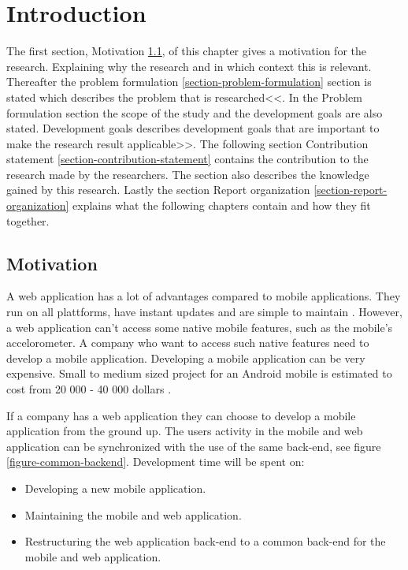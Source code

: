 \chapter{Introduction}\label{chapter-introduction}
The first section, Motivation \ref{section-motivation}, of this chapter gives a motivation for the research. Explaining why the research and in which context this is relevant. Thereafter the problem formulation \ref{section-problem-formulation} section is stated which describes the problem that is researched<<. In the Problem formulation section the scope of the study and the development goals are also stated. Development goals describes development goals that are important to make the research result applicable>>. The following section Contribution statement \ref{section-contribution-statement} contains the contribution to the research made by the researchers. The section also describes the knowledge gained by this research. Lastly the section Report organization \ref{section-report-organization} explains what the following chapters contain and how they fit together.

\section{Motivation}\label{section-motivation}
A web application has a lot of advantages compared to mobile applications. They run on all plattforms, have instant updates and are simple to maintain \cite{michaels2013}. However, a web application can't access some native mobile features, such as the mobile's accelorometer. A company who want to access such native features need to develop a mobile application. Developing a mobile application can be very expensive. Small to medium sized project for an Android mobile is estimated to cost from 20 000 - 40 000 dollars \cite{kohan2015}.

If a company has a web application they can choose to develop a mobile application from the ground up. The users activity in the mobile and web application can be synchronized with the use of the same back-end, see figure \ref{figure-common-backend}. Development time will be spent on: 
\begin{itemize}
\item Developing a new mobile application.
\item Maintaining the mobile and web application.
\item Restructuring the web application back-end to a common back-end for the mobile and web application.
\end{itemize}

